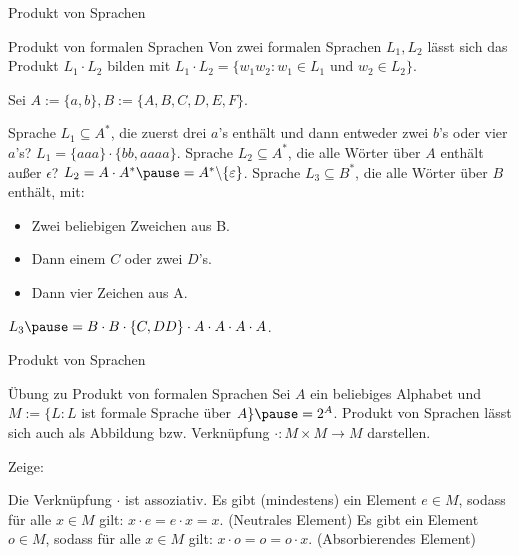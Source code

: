 \begin{frame}{Produkt von Sprachen}
	\begin{block}{Produkt von formalen Sprachen}
		Von zwei formalen Sprachen $L_1, L_2$ \pause lässt sich das Produkt \pause $L_1 \cdot L_2$ \pause bilden mit \pause $L_1 \cdot L_2 = \{w_1w_2 : w_1 \in L_1 $ und $w_2 \in L_2 \}$.
	\end{block}

	Sei $A := \{a, b\}, B := \{A, B, C, D, E, F\}$.
	
	\begin{itemize}
		\pitem Sprache $L_1 \subseteq A^*$, die zuerst drei $a$'s enthält und dann entweder zwei $b$'s oder vier $a$'s? $L_1 = \{aaa\}\cdot\{bb,aaaa\}$.
		\pitem Sprache $L_2 \subseteq A^*$, die alle Wörter über $A$ enthält außer $\epsilon$? \pause $L_2 = A \cdot A^* \pause = A^* \backslash \{\epsilon\}$.
		\pitem Sprache $L_3 \subseteq B^*$, die alle Wörter über $B$ enthält, mit:
		\begin{itemize}
			\p\item Zwei beliebigen Zweichen aus B.
			\p\item Dann einem $C$ oder zwei $D$'s.
			\p\item Dann vier Zeichen aus A.
		\end{itemize}
		\pitem $L_3 \p = B \cdot B \cdot \{C, DD\} \cdot A \cdot A \cdot A \cdot A$.
	\end{itemize}
\end{frame}

\begin{frame}{Produkt von Sprachen}	
	\begin{taskblock}{Übung zu Produkt von formalen Sprachen}
		Sei $A$ ein beliebiges Alphabet und $M := \{L : L $ ist formale Sprache über $A \} \pause = 2^A$. \pause Produkt von Sprachen lässt sich auch als Abbildung bzw. Verknüpfung $\cdot : M \times M \rightarrow M$ darstellen.
		
		Zeige: 
		\begin{itemize}
			\pitem Die Verknüpfung $\cdot$ ist assoziativ.
			\pitem Es gibt (mindestens) ein Element $e \in M$, sodass für alle $x \in M$ gilt: $x \cdot e = e \cdot x = x$. (Neutrales Element)
			\pitem Es gibt ein Element $o \in M$, sodass für alle $x \in M$ gilt: $x \cdot o = o = o \cdot x$. (Absorbierendes Element)
		\end{itemize}
	\end{taskblock}
\end{frame}

